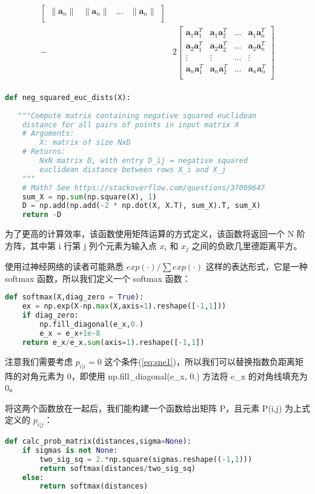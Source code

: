 \begin{equation}
\begin{split}
\begin{bmatrix}
			\|\mathbf{a}_n\|&\|\mathbf{a}_n\|&\ldots&\|\mathbf{a}_n\|\\
		    \end{bmatrix}\\
		    -&2\begin{bmatrix}
			    \mathbf{a}_1\mathbf{a}_1^T& \mathbf{a}_1\mathbf{a}_2^T&\ldots& \mathbf{a}_1\mathbf{a}_n^T\\
			    \mathbf{a}_2\mathbf{a}_1^T& \mathbf{a}_2\mathbf{a}_2^T&\ldots& \mathbf{a}_2\mathbf{a}_n^T\\
			\vdots&\vdots&\ldots&\vdots\\
			    \mathbf{a}_n\mathbf{a}_1^T& \mathbf{a}_n\mathbf{a}_2^T&\ldots& \mathbf{a}_n\mathbf{a}_n^T\\
		    \end{bmatrix}\\
	\end{split}
\end{equation}
\begin{lstlisting}[language=Python]
def neg_squared_euc_dists(X):
    
   """Compute matrix containing negative squared euclidean
    distance for all pairs of points in input matrix X
    # Arguments:
        X: matrix of size NxD
    # Returns:
        NxN matrix D, with entry D_ij = negative squared
        euclidean distance between rows X_i and X_j
    """
    # Math? See https://stackoverflow.com/questions/37009647
    sum_X = np.sum(np.square(X), 1)    
    D = np.add(np.add(-2 * np.dot(X, X.T), sum_X).T, sum_X)    
    return -D
\end{lstlisting}
为了更高的计算效率，该函数使用矩阵运算的方式定义，该函数将返回一个 N 阶方阵，其中第 i 行第 j 列个元素为输入点 $x_i$ 和 $x_j$ 之间的负欧几里德距离平方。

使用过神经网络的读者可能熟悉 $exp(\cdot)/\sum exp(\cdot)$ 这样的表达形式，它是一种 softmax 函数，所以我们定义一个 softmax 函数：
\begin{lstlisting}[language=Python]
def softmax(X,diag_zero = True):
    ex = np.exp(X-np.max(X,axis=1).reshape([-1,1]))
    if diag_zero:
        np.fill_diagonal(e_x,0.)
        e_x = e_x+1e-8
    return e_x/e_x.sum(axis=1).reshape([-1,1])
\end{lstlisting}
注意我们需要考虑 $p_{i|i}=0$ 这个条件(\ref{eq:sne1})，所以我们可以替换指数负距离矩阵的对角元素为 0，即使用 np.fill\_diagonal(e\_x, 0.) 方法将 e\_x 的对角线填充为 0。

将这两个函数放在一起后，我们能构建一个函数给出矩阵 P，且元素 P(i,j) 为上式定义的 $p_{i|j}$：
\begin{lstlisting}[language=Python]
def calc_prob_matrix(distances,sigma=None):
    if sigmas is not None:
        two_sig_sq = 2.*np.square(sigmas.reshape((-1,1)))
        return softmax(distances/two_sig_sq)
    else:
        return softmax(distances)
\end{lstlisting}
